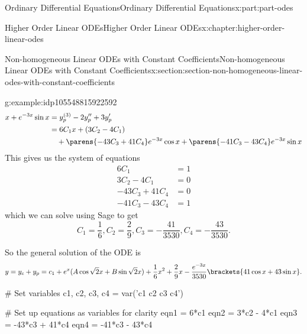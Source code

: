 \documentclass[twoside,10pt,]{book}
\numberwithin{equation}{part}
\newcommand{\amp}{&}
\begin{document}
\begin{partptx}{Ordinary Differential Equations}{}{Ordinary Differential Equations}{}{}{x:part:part-odes}
\begin{chapterptx}{Higher Order Linear ODEs}{}{Higher Order Linear ODEs}{}{}{x:chapter:higher-order-linear-odes}
\begin{sectionptx}{Non-homogeneous Linear ODEs with Constant Coefficients}{}{Non-homogeneous Linear ODEs with Constant Coefficients}{}{}{x:section:section-non-homogeneous-linear-odes-with-constant-coefficients}
\begin{example}{}{g:example:idp105548815922592}
\begin{align*}
x+e^{-3x}\sin x \amp= y^{(3)}_{p}-2y''_{p}+3y'_{p}\\
\amp= 6C_{1}x+(3C_{2}-4C_{1}) \\
\amp\quad + \parens{-43C_{3}+41C_{4}}e^{-3x}\cos x+\parens{-41C_{3}-43C_{4}}e^{-3x}\sin x
\end{align*}
This gives us the system of equations%
\begin{align*}
6C_{1}  \amp=  1\\
3C_{2}-4C_{1} \amp=  0\\
-43C_{3}+41C_{4}  \amp=  0\\
-41C_{3}-43C_{4}  \amp= 1
\end{align*}
which we can solve using Sage to get%
\begin{equation*}
C_{1} = \frac{1}{6},C_{2} = \frac{2}{9},C_{3} = -\frac{41}{3530},C_{4}=-\frac{43}{3530}.
\end{equation*}
%
\par
So the general solution of the ODE is%
\begin{equation*}
y = y_{c}+y_{p} = c_{1}+e^{x}(A\cos\sqrt{2}x+B\sin\sqrt{2}x) +\frac{1}{6}x^{2}+\frac{2}{9}x-\frac{e^{-3x}}{3530}\brackets{41\cos x+43\sin x}.
\end{equation*}
%
\end{example}
\begin{sageinput}
# Set variables
c1, c2, c3, c4 = var('c1 c2 c3 c4')

# Set up equations as variables for clarity
eqn1 = 6*c1
eqn2 = 3*c2 - 4*c1
eqn3 = -43*c3 + 41*c4
eqn4 = -41*c3 - 43*c4


\end{sageinput}
\end{sectionptx}
\end{chapterptx}
\end{partptx}
\end{document}
